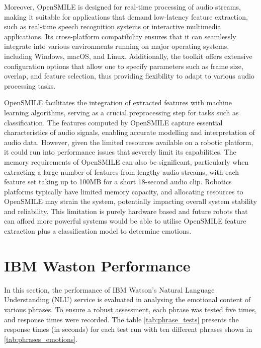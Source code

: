 Moreover, OpenSMILE is designed for real-time processing of audio streams, making it suitable for applications that demand low-latency feature extraction, such as real-time speech recognition systems or interactive multimedia applications. Its cross-platform compatibility ensures that it can seamlessly integrate into various environments running on major operating systems, including Windows, macOS, and Linux. Additionally, the toolkit offers extensive configuration options that allow one to specify parameters such as frame size, overlap, and feature selection, thus providing flexibility to adapt to various audio processing tasks.

OpenSMILE facilitates the integration of extracted features with machine learning algorithms, serving as a crucial preprocessing step for tasks such as classification. The features computed by OpenSMILE capture essential characteristics of audio signals, enabling accurate modelling and interpretation of audio data. However, given the limited resources available on a robotic platform, it could run into performance issues that severely limit its capabilities. The memory requirements of OpenSMILE can also be significant, particularly when extracting a large number of features from lengthy audio streams, with each feature set taking up to 100MB for a short 18-second audio clip. Robotics platforms typically have limited memory capacity, and allocating resources to OpenSMILE may strain the system, potentially impacting overall system stability and reliability. This limitation is purely hardware based and future robots that can afford more powerful systems would be able to utilise OpenSMILE feature extraction plus a classification model to determine emotions.

\section{IBM Waston Performance}

In this section, the performance of IBM Watson's Natural Language Understanding (NLU) service is evaluated in analysing the emotional content of various phrases. To ensure a robust assessment, each phrase was tested five times, and response times were recorded. The table \ref{tab:phrase_tests} presents the response times (in seconds) for each test run with ten different phrases shown in \ref{tab:phrases_emotions}.

